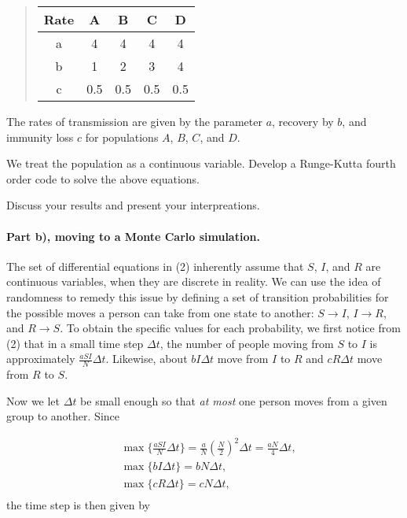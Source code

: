 \documentclass[%
oneside,                 %
final,                   %
10pt]{article}
\begin{document}
\begin{quote}
\begin{tabular}{ccccc}
\hline
\multicolumn{1}{c}{ \textbf{Rate} } & \multicolumn{1}{c}{ \textbf{A} } & \multicolumn{1}{c}{ \textbf{B} } & \multicolumn{1}{c}{ \textbf{C} } & \multicolumn{1}{c}{ \textbf{D} } \\
\hline
a             & 4          & 4          & 4          & 4          \\
b             & 1          & 2          & 3          & 4          \\
c             & 0.5        & 0.5        & 0.5        & 0.5        \\
\hline
\end{tabular}
\end{quote}

\noindent
The rates of transmission are given by the parameter $a$, recovery by $b$, and immunity loss $c$ for populations $A$, $B$, $C$, and $D$.

We treat the population as a continuous variable. Develop a Runge-Kutta fourth order code
to solve the above equations.

Discuss your results and present your interpreations.

\paragraph{Part b), moving to a Monte Carlo simulation.}
The set of differential equations in (2) inherently assume that $S$,
$I$, and $R$ are continuous variables, when they are discrete in
reality. We can use the idea of randomness to remedy this issue by
defining a set of transition probabilities for the possible moves a
person can take from one state to another: $S\rightarrow I$, $I
\rightarrow R$, and $R \rightarrow S$. To obtain the specific values
for each probability, we first notice from (2) that in a small time
step $\Delta t$, the number of people moving from $S$ to $I$ is
approximately $\frac{aSI}{N}\Delta t$. Likewise, about $bI\Delta t$
move from $I$ to $R$ and $cR\Delta t$ move from $R$ to $S$. 

Now we let $\Delta t$ be small enough so that \emph{at most} one person moves from a given group to another. Since

\begin{equation}
\begin{split}
&\max \Big\{ \frac{aSI}{N}\Delta t \Big\} = \frac{a}{N}\left(\frac{N}{2}\right)^2\Delta t=\frac{aN}{4}\Delta t,\\
&\max \Big\{ bI\Delta t \Big\} = bN\Delta t,\\
&\max \Big\{ cR\Delta t \Big\} = cN\Delta t,\\
\end{split}
\end{equation}
the time step is then given by
\end{document}
